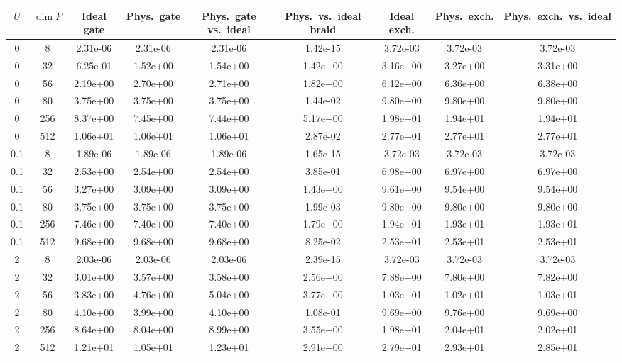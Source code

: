 \begin{tabular}{ccccccccc}
\hline
$U$ & $\dim P$ & Ideal gate & Phys.\ gate & Phys.\ gate vs.\ ideal & Phys.\ vs.\ ideal braid & Ideal exch. & Phys.\ exch. & Phys.\ exch.\ vs.\ ideal \\
\hline
0 & 8 & 2.31e-06 & 2.31e-06 & 2.31e-06 & 1.42e-15 & 3.72e-03 & 3.72e-03 & 3.72e-03 \\
0 & 32 & 6.25e-01 & 1.52e+00 & 1.54e+00 & 1.42e+00 & 3.16e+00 & 3.27e+00 & 3.31e+00 \\
0 & 56 & 2.19e+00 & 2.70e+00 & 2.71e+00 & 1.82e+00 & 6.12e+00 & 6.36e+00 & 6.38e+00 \\
0 & 80 & 3.75e+00 & 3.75e+00 & 3.75e+00 & 1.44e-02 & 9.80e+00 & 9.80e+00 & 9.80e+00 \\
0 & 256 & 8.37e+00 & 7.45e+00 & 7.44e+00 & 5.17e+00 & 1.98e+01 & 1.94e+01 & 1.94e+01 \\
0 & 512 & 1.06e+01 & 1.06e+01 & 1.06e+01 & 2.87e-02 & 2.77e+01 & 2.77e+01 & 2.77e+01 \\
\hline
0.1 & 8 & 1.89e-06 & 1.89e-06 & 1.89e-06 & 1.65e-15 & 3.72e-03 & 3.72e-03 & 3.72e-03 \\
0.1 & 32 & 2.53e+00 & 2.54e+00 & 2.54e+00 & 3.85e-01 & 6.98e+00 & 6.97e+00 & 6.97e+00 \\
0.1 & 56 & 3.27e+00 & 3.09e+00 & 3.09e+00 & 1.43e+00 & 9.61e+00 & 9.54e+00 & 9.54e+00 \\
0.1 & 80 & 3.75e+00 & 3.75e+00 & 3.75e+00 & 1.99e-03 & 9.80e+00 & 9.80e+00 & 9.80e+00 \\
0.1 & 256 & 7.46e+00 & 7.40e+00 & 7.40e+00 & 1.79e+00 & 1.94e+01 & 1.93e+01 & 1.93e+01 \\
0.1 & 512 & 9.68e+00 & 9.68e+00 & 9.68e+00 & 8.25e-02 & 2.53e+01 & 2.53e+01 & 2.53e+01 \\
\hline
2 & 8 & 2.03e-06 & 2.03e-06 & 2.03e-06 & 2.39e-15 & 3.72e-03 & 3.72e-03 & 3.72e-03 \\
2 & 32 & 3.01e+00 & 3.57e+00 & 3.58e+00 & 2.56e+00 & 7.88e+00 & 7.80e+00 & 7.82e+00 \\
2 & 56 & 3.83e+00 & 4.76e+00 & 5.04e+00 & 3.77e+00 & 1.03e+01 & 1.02e+01 & 1.03e+01 \\
2 & 80 & 4.10e+00 & 3.99e+00 & 4.10e+00 & 1.08e-01 & 9.69e+00 & 9.76e+00 & 9.69e+00 \\
2 & 256 & 8.64e+00 & 8.04e+00 & 8.99e+00 & 3.55e+00 & 1.98e+01 & 2.04e+01 & 2.02e+01 \\
2 & 512 & 1.21e+01 & 1.05e+01 & 1.23e+01 & 2.91e+00 & 2.79e+01 & 2.93e+01 & 2.85e+01 \\
\hline
\end{tabular}
